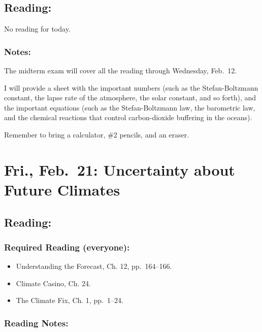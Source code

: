\documentclass[
]{article}
\providecommand{\tightlist}{%
  \setlength{\itemsep}{0pt}\setlength{\parskip}{0pt}}
\begin{document}
\hypertarget{reading-18}{%
\subsection{Reading:}\label{reading-18}}

No reading for today.

\hypertarget{notes-3}{%
\subsubsection{Notes:}\label{notes-3}}

The midterm exam will cover all the reading through Wednesday, Feb.~12.

I will provide a sheet with the important numbers (such as the
Stefan-Boltzmann constant, the lapse rate of the atmosphere, the solar
constant, and so forth), and the important equations (such as the
Stefan-Boltzmann law, the barometric law, and the chemical reactions
that control carbon-dioxide buffering in the oceans).

Remember to bring a calculator, \#2 pencils, and an eraser.

\hypertarget{fri.-feb.-21-uncertainty-about-future-climates}{%
\section{Fri., Feb.~21: Uncertainty about Future
Climates}\label{fri.-feb.-21-uncertainty-about-future-climates}}

\hypertarget{reading-19}{%
\subsection{Reading:}\label{reading-19}}

\hypertarget{required-reading-everyone-14}{%
\subsubsection{Required Reading
(everyone):}\label{required-reading-everyone-14}}

\begin{itemize}
\tightlist
\item
  Understanding the Forecast, Ch. 12, pp.~164--166.
\item
  Climate Casino, Ch. 24.
\item
  The Climate Fix, Ch. 1, pp.~1--24.
\end{itemize}

\hypertarget{reading-notes-14}{%
\subsubsection{Reading Notes:}\label{reading-notes-14}}
\end{document}
